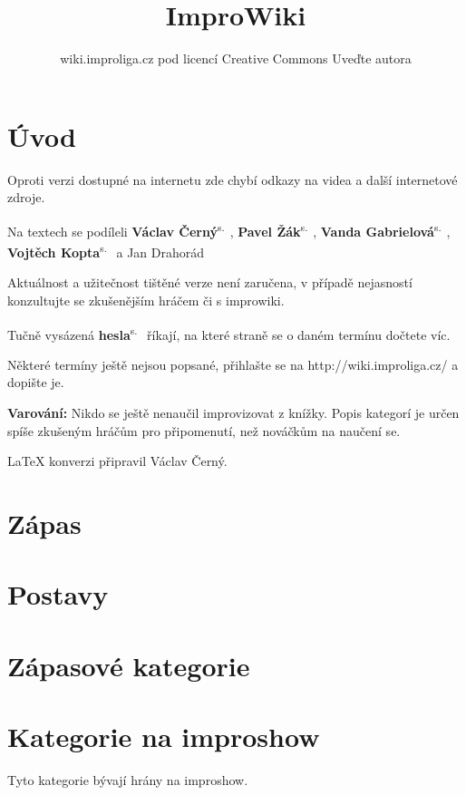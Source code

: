 \documentclass[a4paper,10pt,openany]{book}
\title{ImproWiki}
\author{wiki.improliga.cz pod licencí Creative Commons Uveďte autora}
\newcommand{\odkaz}[2]{\textbf{#1}\textsuperscript{s.~\pageref{#2}}}
\begin{document}
\begin{titlepage}
\maketitle
\end{titlepage}
 
\chapter{Úvod}\label{úvod}

 

Oproti verzi dostupné na internetu zde chybí odkazy na videa a další internetové zdroje.

Na textech se podíleli \odkaz{Václav Černý}{uživatel:vatoz}, \odkaz{Pavel Žák}{uživatel:just-paja}, \odkaz{Vanda Gabrielová}{uživatel:vandagabi}, \odkaz{Vojtěch Kopta}{uživatel:vojtechkopta} a Jan Drahorád

Aktuálnost a užitečnost tištěné verze není zaručena, v případě nejasností konzultujte se zkušenějším hráčem či s improwiki.

Tučně vysázená \odkaz{hesla}{úvod} říkají, na které straně se o daném termínu dočtete víc.

Některé termíny ještě nejsou popsané, přihlašte se na http://wiki.improliga.cz/ a dopište je.

\textbf{Varování:} Nikdo se ještě nenaučil improvizovat z knížky. Popis kategorí je určen spíše zkušeným hráčům pro připomenutí, než nováčkům na naučení se.  

\LaTeX{} konverzi připravil  Václav Černý. 
\chapter{Zápas}







\chapter{Postavy}



\chapter{Zápasové kategorie}
\label{zápasové kategorie}
\label{:kategorie:zápasové kategorie}



\chapter{Kategorie na improshow}\label{další kategorie}
\label{:kategorie:kategorie na improshow}
Tyto kategorie bývají hrány na improshow.

\end{document}
